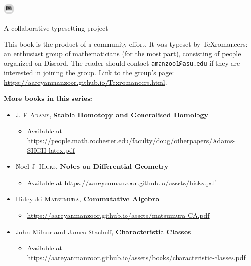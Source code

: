 \documentclass[../main]{subfiles}
\begin{document}

\newpage
\thispagestyle{empty}

\begin{center}
    \Huge{
    \includegraphics[height=1.5em]{texromancers_gray.pdf}
    }
    
    \normalsize{A collaborative typesetting project}
\end{center}

\noindent\makebox[\linewidth]{\rule{\linewidth}{0.4pt}}

\bigskip

This book is the product of a community effort. It was typeset by \TeX{}romancers: an enthusiast group of mathematicians (for the most part), consisting of people organized on Discord. The reader should contact \texttt{amanzoo1@asu.edu} if they are interested in joining the group. Link to the group's page: \url{https://aareyanmanzoor.github.io/Texromancers.html}.

\noindent\makebox[\linewidth]{\rule{\linewidth}{0.4pt}}

\bigskip

\noindent\textbf{More books in this series:}
\begin{itemize}
    \item J. F \textsc{Adams}, \textbf{Stable Homotopy and Generalised Homology}
        \begin{itemize}
            \item Available at \url{https://people.math.rochester.edu/faculty/doug/otherpapers/Adams-SHGH-latex.pdf}
        \end{itemize}
    \item Noel J. \textsc{Hicks}, \textbf{Notes on Differential Geometry}
        \begin{itemize}
            \item Available at \url{https://aareyanmanzoor.github.io/assets/hicks.pdf}
        \end{itemize}
    \item Hideyuki \textsc{Matsumura}, \textbf{Commutative Algebra}
        \begin{itemize}
            \item \url{https://aareyanmanzoor.github.io/assets/matsumura-CA.pdf}
        \end{itemize}
    \item John Milnor and James Stasheff, \textbf{Characteristic Classes}
    \begin{itemize}
        \item Available at \url{https://aareyanmanzoor.github.io/assets/books/characteristic-classes.pdf}
    \end{itemize}
\end{itemize}

\vfill
\end{document}
